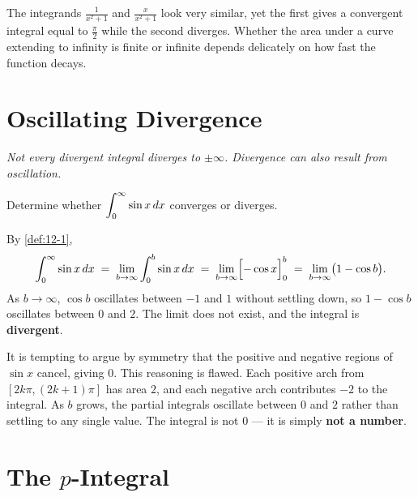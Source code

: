 \begin{remark}
The integrands $\frac{1}{x^{2}+1}$ and $\frac{x}{x^{2}+1}$ look very similar, yet the first gives a convergent integral equal to $\frac{\pi}{2}$ while the second diverges.  Whether the area under a curve extending to infinity is finite or infinite depends delicately on how fast the function decays.
\end{remark}

\section{Oscillating Divergence}
\label{sec:12.3}

\textit{Not every divergent integral diverges to $\pm\infty$.  Divergence can also result from oscillation.}

\begin{example}
\label{ex:12-3}
Determine whether $\displaystyle\int_{0}^{\infty}\sin x\,dx$ converges or diverges.

By \cref{def:12-1},
\[
  \int_{0}^{\infty}\sin x\,dx
  \;=\; \lim_{b\to\infty}\int_{0}^{b}\sin x\,dx
  \;=\; \lim_{b\to\infty}\Bigl[-\cos x\Bigr]_{0}^{b}
  \;=\; \lim_{b\to\infty}\bigl(1 - \cos b\bigr).
\]
As $b\to\infty$, $\cos b$ oscillates between $-1$ and $1$ without settling down, so $1-\cos b$ oscillates between $0$ and $2$.  The limit does not exist, and the integral is \textbf{divergent}.
\end{example}

\begin{remark}
It is tempting to argue by symmetry that the positive and negative regions of $\sin x$ cancel, giving $0$.  This reasoning is flawed.  Each positive arch from $[2k\pi,(2k+1)\pi]$ has area $2$, and each negative arch contributes $-2$ to the integral.  As $b$ grows, the partial integrals oscillate between $0$ and $2$ rather than settling to any single value.  The integral is not $0$ --- it is simply \textbf{not a number}.
\end{remark}

\section{The $p$-Integral}
\label{sec:12.4}

